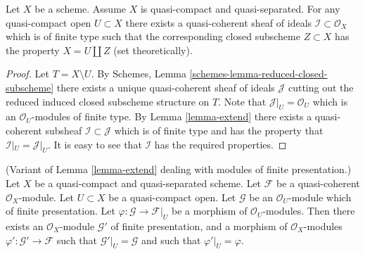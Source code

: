 \begin{lemma}
\label{lemma-quasi-coherent-finite-type-ideals}
Let $X$ be a scheme.
Assume $X$ is quasi-compact and quasi-separated.
For any quasi-compact open $U \subset X$ there exists
a quasi-coherent sheaf of ideals $\mathcal{I} \subset \mathcal{O}_X$
which is of finite type such that the corresponding closed
subscheme $Z \subset X$ has the property $X = U \coprod Z$
(set theoretically).
\end{lemma}

\begin{proof}
Let $T = X \setminus U$. By
Schemes, Lemma \ref{schemes-lemma-reduced-closed-subscheme} there exists
a unique quasi-coherent sheaf of ideals $\mathcal{J}$ cutting
out the reduced induced closed subscheme structure on $T$.
Note that $\mathcal{J}|_U = \mathcal{O}_U$ which is an
$\mathcal{O}_U$-modules of finite type.
By Lemma \ref{lemma-extend} there exists a quasi-coherent subsheaf
$\mathcal{I} \subset \mathcal{J}$ which is of finite type
and has the property that $\mathcal{I}|_U = \mathcal{J}|_U$.
It is easy to see that $\mathcal{I}$ has the required properties.
\end{proof}

\begin{lemma}
\label{lemma-extend-finite-presentation}
(Variant of Lemma \ref{lemma-extend} dealing with modules of
finite presentation.)
Let $X$ be a quasi-compact and quasi-separated scheme.
Let $\mathcal{F}$ be a quasi-coherent $\mathcal{O}_X$-module.
Let $U \subset X$ be a quasi-compact open.
Let $\mathcal{G}$ be an $\mathcal{O}_U$-module which of finite presentation.
Let $\varphi : \mathcal{G} \to \mathcal{F}|_U$ be a morphism of
$\mathcal{O}_U$-modules.
Then there exists an $\mathcal{O}_X$-module
$\mathcal{G}'$ of finite presentation, and a morphism
of $\mathcal{O}_X$-modules $\varphi' : \mathcal{G}' \to \mathcal{F}$
such that $\mathcal{G}'|_U = \mathcal{G}$ and such that
$\varphi'|_U = \varphi$.
\end{lemma}

